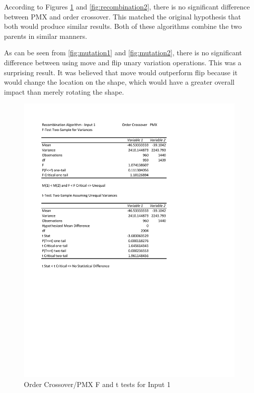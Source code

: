 \documentclass[times]{article}
\begin{document}
	According to Figures \ref{fig:recombination1} and \ref{fig:recombination2}, there is no significant difference between PMX and order crossover. This matched the original hypothesis that both would produce similar results. Both of these algorithms combine the two parents in similar manners.

	As can be seen from \ref{fig:mutation1} and \ref{fig:mutation2}, there is no significant difference between using move and flip unary variation operations. This was a surprising result. It was believed that move would outperform flip because it would change the location on the shape, which would have a greater overall impact than merely rotating the shape. 


	\begin{figure}
		\caption{Order Crossover/PMX F and t tests for Input 1}
		\label{fig:recombination1}
		\includegraphics[width=\textwidth]{./t_test/Recombination1}
	\end{figure}
\end{document}

